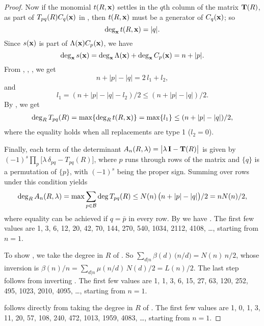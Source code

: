 \documentclass[preprint]{revtex4-1}
\begin{document}
\begin{proof}
%
Now if the monomial $t(R, \mathbf{x})$ settles in the $q$th column of
  the matrix $\mathbf{T}(R)$, as part
  of $T_{pq}(R) C_q(\mathbf{x})$ in ,
then
  $t(R, \mathbf{x})$
  must be
  a generator of $C_q(\mathbf{x})$;
so
%
\begin{equation}
  \deg_{\mathbf{x}} t(R, \mathbf{x}) = |q|.
\label{eq:degxt}
\end{equation}
%
Since $s(\mathbf{x})$ is part of $\Lambda(\mathbf{x}) C_p(\mathbf{x})$,
  we have
%
\begin{equation}
  \deg_{\mathbf{x}} s(\mathbf{x}) = \deg_{\mathbf{x}} \Lambda(\mathbf{x}) + \deg_{\mathbf{x}} C_p(\mathbf{x})
  = n + |p|.
\label{eq:degxs}
\end{equation}
%
%
From , , , we get
\[
  n + |p| - |q| = 2 \, l_1 + l_2,
\]
and
\begin{equation}
  l_1  =    (n + |p| - |q| - l_2)/2
             \le  (n + |p| - |q|)/2.
\label{eq:l1limit}
\end{equation}
By , we get
\begin{align*}
  \deg_R T_{pq}(R)
  = \max\{ \deg_R t(R, \mathbf{x}) \}
  = \max\{ l_1 \}
  \le   (n + |p| - |q|)/2,
\end{align*}
where the equality holds when all replacements are type 1 ($l_2 = 0$).


Finally, each term of the determinant
$A_n(R, \lambda) = \big|\lambda \, \mathbf{I} - \mathbf{T}(R)\big|$
is given by
$(-1)^s \prod_{p} \big[\lambda \, \delta_{p q} - T_{pq}(R)\big]$,
where $p$ runs through rows of the matrix
  and $\{q\}$ is a permutation of $\{p\}$,
  with $(-1)^s$ being the proper sign.
Summing over rows under this condition yields
\begin{align*}
  \deg_R A_n(R, \lambda)
  = \max \sum_{p \in \mathcal B} \deg T_{pq}(R)
  \le N(n) \, \big(n + |p| - |q|\big)/2 = n N(n)/2,
\end{align*}
where equality can be achieved if $q = \bar p$ in every row.
By  we have .
%
The first few values are 1, 3, 6, 12, 20, 42, 70, 144, 270, 540, 1034, 2112, 4108, \dots, starting from $n = 1$.



To show , we take the degree in $R$ of .
So $\sum_{d|n} \beta(d) \, \big(n/d\big) = N(n) \, n/2$,
whose inversion is
  $\beta(n)/n = \sum_{d|n} \mu(n/d) \, N(d)/2 = L(n)/2$.
The last step follows from inverting .
%
The first few values are 1, 1, 3, 6, 15, 27, 63, 120, 252, 495, 1023, 2010, 4095, \dots, starting from $n = 1$.

 follows directly from taking the degree in $R$ of .
The first few values are 1, 0, 1, 3, 11, 20, 57, 108, 240, 472, 1013, 1959, 4083, \dots, starting from $n = 1$.
\end{proof}
\end{document}

